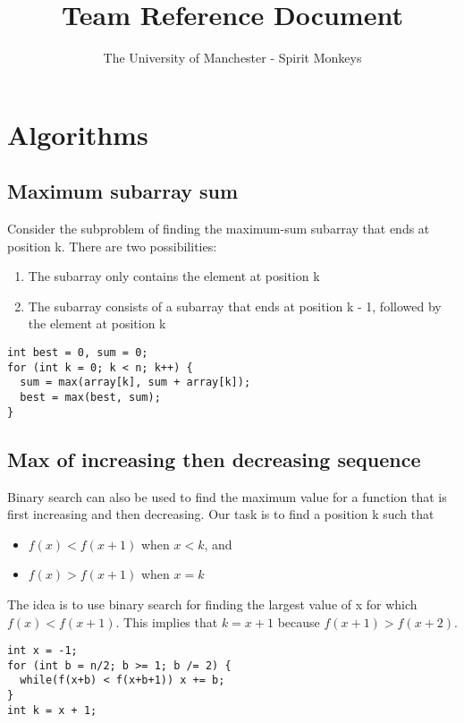 \documentclass[a4paper]{article}
\title{Team Reference Document}
\author{The University of Manchester - Spirit Monkeys}
\begin{document}
\maketitle
\newpage

\section{Algorithms}


\subsection{Maximum subarray sum}
Consider the subproblem of finding the maximum-sum subarray that ends at position k. There are two possibilities:
\begin{enumerate}
  \item The subarray only contains the element at position k
  \item The subarray consists of a subarray that ends at position k - 1, followed by the element at position k
\end{enumerate}
\begin{lstlisting}
int best = 0, sum = 0;
for (int k = 0; k < n; k++) {
  sum = max(array[k], sum + array[k]);
  best = max(best, sum);
}
\end{lstlisting}


\subsection{Max of increasing then decreasing sequence}
Binary search can also be used to find the maximum value for a function that is first increasing and then decreasing. Our task is to find a position k such that
\begin{itemize}
  \item $f(x) < f(x + 1)$ when $x < k$, and
  \item $f(x) > f(x + 1)$ when $x = k$
\end{itemize}
The idea is to use binary search for finding the largest value of x for which $f (x) < f(x + 1)$. This implies that $k = x + 1$ because $f(x + 1) > f(x + 2)$.
\begin{lstlisting}
int x = -1;
for (int b = n/2; b >= 1; b /= 2) {
  while(f(x+b) < f(x+b+1)) x += b;
}
int k = x + 1;
\end{lstlisting}
\end{document}
